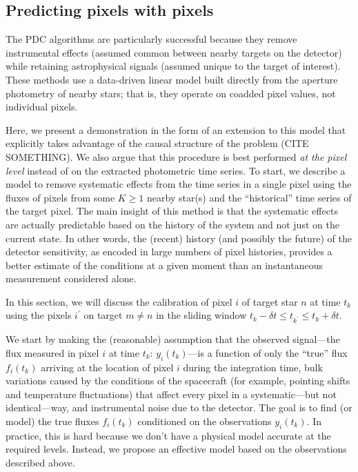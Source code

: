 \documentclass[letterpaper,12pt,whitepaper]{haastex}
\begin{document}
\subsection{Predicting pixels with pixels}\label{sec:pixels}
The PDC algorithms \citep{map-pdc1,map-pdc2} are particularly
successful because they remove instrumental effects (assumed common between
nearby targets on the detector) while retaining astrophysical signals (assumed
unique to the target of interest).
These methods use a data-driven linear model built directly from the aperture
photometry of nearby stars; that is, they operate on coadded pixel values,
not individual pixels.

Here, we present a demonstration in the form of an extension to this model
that explicitly takes advantage of the causal structure of the problem (CITE
SOMETHING).
We also argue that this procedure is best performed \emph{at the pixel level}
instead of on the extracted photometric time series.
To start, we describe a model to remove systematic effects from the time
series in a single pixel using the fluxes of pixels from some $K\ge1$ nearby
star(s) and the ``historical'' time series of the target pixel.
The main insight of this method is that the systematic effects are actually
predictable based on the history of the system and not just on the current
state.
In other words, the (recent) history (and possibly the future) of the detector
sensitivity, as encoded in large numbers of pixel histories, provides a
better estimate of the conditions at a given moment than an
instantaneous measurement considered alone.

In this section,
we will discuss the calibration of pixel $i$ of target star $n$ at time $t_k$
using the pixels $i^\prime$ on target $m \ne n$ in the sliding window $t_k -
\delta t \le t_{k^\prime} \le t_k + \delta t$.

We start by making the (reasonable) assumption that the observed signal---the
flux measured in pixel $i$ at time $t_k$: $y_i (t_k)$---is a function of only
the ``true'' flux $f_i(t_k)$ arriving at the location of pixel $i$ during the
integration time,
bulk variations caused by the conditions of the spacecraft (for example,
pointing shifts and temperature fluctuations) that affect every pixel in a
systematic---but not identical---way, and
instrumental noise due to the detector.
The goal is to find (or model) the true fluxes $f_i(t_k)$ conditioned on the
observations $y_i(t_k)$.
In practice, this is hard because we don't have a physical model accurate at
the required levels.
Instead, we propose an effective model based on the observations described
above.
\end{document}
